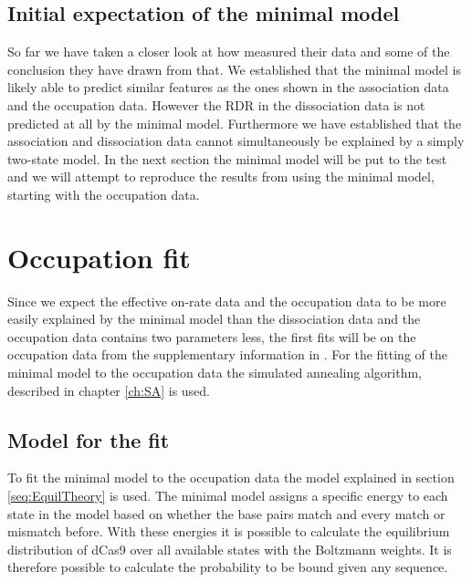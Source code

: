 \subsection{Initial expectation of the minimal model}

So far we have taken a closer look at how \cite{PNAS} measured their data and some of the conclusion they have drawn from that. We established that the minimal model is likely able to predict similar features as the ones shown in the association data and the occupation data. However the RDR in the dissociation data is not predicted at all by the minimal model. Furthermore we have established that the association and dissociation data cannot simultaneously be explained by a simply two-state model. In the next section the minimal model will be put to the test and we will attempt to reproduce the results from \cite{PNAS} using the minimal model, starting with the occupation data.



\section{Occupation fit}

Since we expect the effective on-rate data and the occupation data to be more easily explained by the minimal model than the dissociation data and the occupation data contains two parameters less, the first fits will be on the occupation data from the supplementary information in \cite{PNAS}. %
For the fitting of the minimal model to the occupation data the simulated annealing algorithm, described in chapter \ref{ch:SA} is used.

\subsection{Model for the fit}
To fit the minimal model to the occupation data the model explained in section \ref{seq:EquilTheory} is used. The minimal model assigns a specific energy to each state in the model based on whether the base pairs match and every match or mismatch before. With these energies it is possible to calculate the equilibrium distribution of dCas9 over all available states with the Boltzmann weights. It is therefore possible to calculate the probability to be bound given any sequence.

